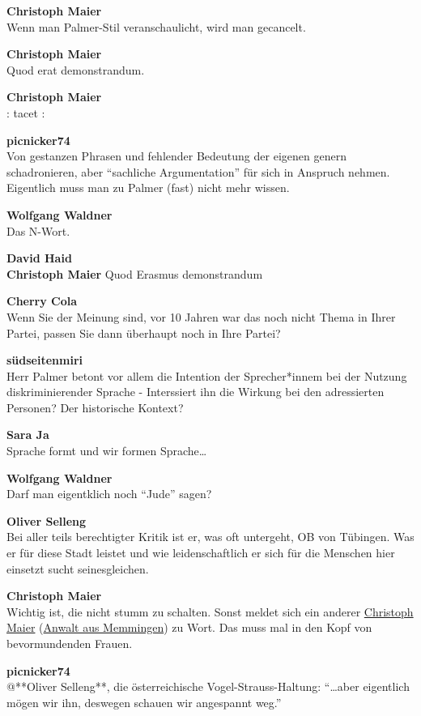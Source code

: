 \documentclass[]{article}
\begin{document}
\textbf{Christoph Maier}\\
Wenn man Palmer-Stil veranschaulicht, wird man gecancelt.

\textbf{Christoph Maier}\\
Quod erat demonstrandum.

\textbf{Christoph Maier}\\
\textbar{}\textbar{}: tacet :\textbar{}\textbar{}

\textbf{picnicker74}\\
Von gestanzen Phrasen und fehlender Bedeutung der eigenen genern
schadronieren, aber ``sachliche Argumentation'' für sich in Anspruch
nehmen. Eigentlich muss man zu Palmer (fast) nicht mehr wissen.

\textbf{Wolfgang Waldner}\\
Das N-Wort. 🙂

\textbf{David Haid}\\
\textbf{Christoph Maier} Quod Erasmus demonstrandum

\textbf{Cherry Cola}\\
Wenn Sie der Meinung sind, vor 10 Jahren war das noch nicht Thema in
Ihrer Partei, passen Sie dann überhaupt noch in Ihre Partei?

\textbf{südseitenmiri}\\
Herr Palmer betont vor allem die Intention der Sprecher*innem bei der
Nutzung diskriminierender Sprache - Interssiert ihn die Wirkung bei den
adressierten Personen? Der historische Kontext?

\textbf{Sara Ja}\\
Sprache formt und wir formen Sprache\ldots{}

\textbf{Wolfgang Waldner}\\
Darf man eigentklich noch ``Jude'' sagen?

\textbf{Oliver Selleng}\\
Bei aller teils berechtigter Kritik ist er, was oft untergeht, OB von
Tübingen. Was er für diese Stadt leistet und wie leidenschaftlich er
sich für die Menschen hier einsetzt sucht seinesgleichen.

\textbf{Christoph Maier}\\
Wichtig ist, die nicht stumm zu schalten. Sonst meldet sich ein anderer
\protect\hyperlink{Christoph-Maier-MdL}{Christoph Maier}
(\protect\hyperlink{Anwalt}{Anwalt aus Memmingen}) zu Wort. Das muss mal
in den Kopf von bevormundenden Frauen.

\textbf{picnicker74}\\
@**Oliver Selleng**, die österreichische Vogel-Strauss-Haltung:
``\ldots{}aber eigentlich mögen wir ihn, deswegen schauen wir angespannt
weg.''
\end{document}
